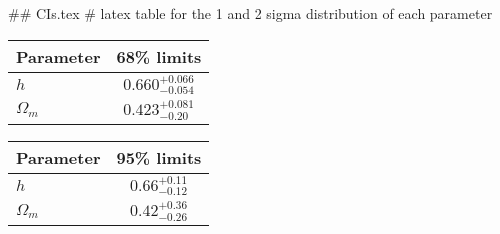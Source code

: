 ## CIs.tex
# latex table for the 1 and 2 sigma distribution of each parameter

\begin{tabular} { l  c}
 Parameter &  68\% limits\\
\hline
{\boldmath$h              $} & $0.660^{+0.066}_{-0.054}   $\\
{\boldmath$\Omega_m       $} & $0.423^{+0.081}_{-0.20}    $\\
\hline
\end{tabular}

\begin{tabular} { l  c}
 Parameter &  95\% limits\\
\hline
{\boldmath$h              $} & $0.66^{+0.11}_{-0.12}      $\\
{\boldmath$\Omega_m       $} & $0.42^{+0.36}_{-0.26}      $\\
\hline
\end{tabular}
